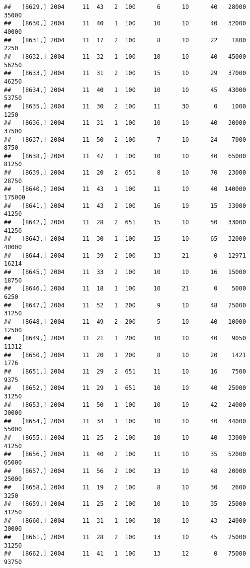 \documentclass{article}\usepackage[]{graphicx}\usepackage[]{color}
\makeatletter
\newenvironment{kframe}{%
 \def\at@end@of@kframe{}%
 \ifinner\ifhmode%
  \def\at@end@of@kframe{\end{minipage}}%
  \begin{minipage}{\columnwidth}%
 \fi\fi%
 \def\FrameCommand##1{\hskip\@totalleftmargin \hskip-\fboxsep
 \colorbox{shadecolor}{##1}\hskip-\fboxsep
     \hskip-\linewidth \hskip-\@totalleftmargin \hskip\columnwidth}%
 \MakeFramed {\advance\hsize-\width
   \@totalleftmargin\z@ \linewidth\hsize
   \@setminipage}}%
 {\par\unskip\endMakeFramed%
 \at@end@of@kframe}
\newenvironment{knitrout}{}{} %
\makeatother
\begin{document}
\begin{knitrout}
\begin{kframe}
\begin{verbatim}
##   [8629,] 2004     11  43   2  100      6      10      40   28000   35000
##   [8630,] 2004     11  40   1  100     10      10      40   32000   40000
##   [8631,] 2004     11  17   2  100      8      10      22    1800    2250
##   [8632,] 2004     11  32   1  100     10      10      40   45000   56250
##   [8633,] 2004     11  31   2  100     15      10      29   37000   46250
##   [8634,] 2004     11  40   1  100     10      10      45   43000   53750
##   [8635,] 2004     11  30   2  100     11      30       0    1000    1250
##   [8636,] 2004     11  31   1  100     10      10      40   30000   37500
##   [8637,] 2004     11  50   2  100      7      10      24    7000    8750
##   [8638,] 2004     11  47   1  100     10      10      40   65000   81250
##   [8639,] 2004     11  20   2  651      8      10      70   23000   28750
##   [8640,] 2004     11  43   1  100     11      10      40  140000  175000
##   [8641,] 2004     11  43   2  100     16      10      15   33000   41250
##   [8642,] 2004     11  28   2  651     15      10      50   33000   41250
##   [8643,] 2004     11  30   1  100     15      10      65   32000   40000
##   [8644,] 2004     11  39   2  100     13      21       0   12971   16214
##   [8645,] 2004     11  33   2  100     10      10      16   15000   18750
##   [8646,] 2004     11  18   1  100     10      21       0    5000    6250
##   [8647,] 2004     11  52   1  200      9      10      48   25000   31250
##   [8648,] 2004     11  49   2  200      5      10      40   10000   12500
##   [8649,] 2004     11  21   1  200     10      10      40    9050   11312
##   [8650,] 2004     11  20   1  200      8      10      20    1421    1776
##   [8651,] 2004     11  29   2  651     11      10      16    7500    9375
##   [8652,] 2004     11  29   1  651     10      10      40   25000   31250
##   [8653,] 2004     11  50   1  100     10      10      42   24000   30000
##   [8654,] 2004     11  34   1  100     10      10      40   44000   55000
##   [8655,] 2004     11  25   2  100     10      10      40   33000   41250
##   [8656,] 2004     11  40   2  100     11      10      35   52000   65000
##   [8657,] 2004     11  56   2  100     13      10      48   20000   25000
##   [8658,] 2004     11  19   2  100      8      10      30    2600    3250
##   [8659,] 2004     11  25   2  100     10      10      35   25000   31250
##   [8660,] 2004     11  31   1  100     10      10      43   24000   30000
##   [8661,] 2004     11  28   2  100     13      10      45   25000   31250
##   [8662,] 2004     11  41   1  100     13      12       0   75000   93750

\end{verbatim}
\end{kframe}
\end{knitrout}
\end{document}
